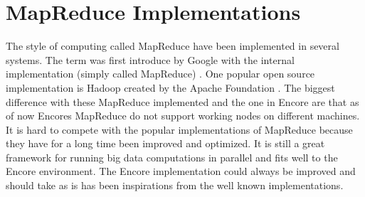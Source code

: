 \section{MapReduce Implementations}
The style of computing called MapReduce have been implemented in several systems. The term was first introduce by Google with the internal implementation (simply called MapReduce) \cite{mining}. One popular open source implementation is Hadoop created by the Apache Foundation \cite{apgit}. The biggest difference with these MapReduce implemented and the one in Encore are that as of now Encores MapReduce do not support working nodes on different machines. It is hard to compete with the popular implementations of MapReduce because they have for a long time been improved and optimized. It is still a great framework for running big data computations in parallel and fits well to the Encore environment. The Encore implementation could always be improved and should take as is has been inspirations from the well known implementations. 